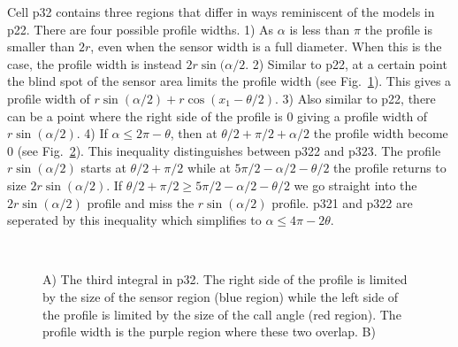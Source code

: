 Cell p32 contains three regions that differ in ways reminiscent of the models in p22. There are four possible profile widths. 1) As $\alpha$ is less than $\pi$ the profile is smaller than $2r$, even when the sensor width is a full diameter. When this is the case, the profile width is instead $2r\sin(\alpha/2$. 2) Similar to p22, at a certain point the blind spot of the sensor area limits the profile width (see Fig.~\ref{f:p32AT}). This gives a profile width of $r\sin(\alpha/2) + r\cos(x_1 - \theta/2)$. 3) Also similar to p22, there can be a point where the right side of the profile is 0 giving a profile width of $r\sin(\alpha/2)$. 4) If $\alpha \le 2\pi - \theta$, then at $\theta/2 + \pi/2 + \alpha/2 $ the profile width become 0 (see Fig.~\ref{f:p32Last}). This inequality distinguishes between p322 and p323. The profile $r\sin(\alpha/2)$ starts at $\theta/2 + \pi/2$ while at $5\pi/2 - \alpha/2 - \theta/2$ the profile returns to size $2r\sin(\alpha/2)$. If $\theta/2 + \pi/2 \ge 5\pi/2 - \alpha/2 - \theta/2$ we go straight into the  $2r\sin(\alpha/2)$ profile and miss the $r\sin(\alpha/2)$ profile.  p321 and p322 are seperated by this inequality which simplifies to $\alpha \le 4\pi - 2\theta$. 



\begin{figure}[t]
        \centering
        \begin{subfigure}[t]{0.3\textwidth}
                \centering
                \caption{}
                \label{f:p32AT}
        \end{subfigure}
~ 
        \begin{subfigure}[t]{0.3\textwidth}
                \centering
                \caption{}
                \label{f:p32Last}
        \end{subfigure}
\caption{A) The third integral in p32. The right side of the profile is limited by the size of the sensor region (blue region) while the left side of the profile is limited by the size of the call angle (red region). The profile width is the purple region where these two overlap. B)     }
\label{f:p32}
\end{figure}

